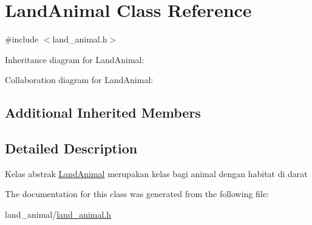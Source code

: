 \hypertarget{classLandAnimal}{}\section{Land\+Animal Class Reference}
\label{classLandAnimal}


{\ttfamily \#include $<$land\+\_\+animal.\+h$>$}



Inheritance diagram for Land\+Animal\+:


Collaboration diagram for Land\+Animal\+:
\subsection*{Additional Inherited Members}


\subsection{Detailed Description}
Kelas abstrak \hyperlink{classLandAnimal}{Land\+Animal} merupakan kelas bagi animal dengan habitat di darat 

The documentation for this class was generated from the following file\+:\begin{DoxyCompactItemize}
\item 
land\+\_\+animal/\hyperlink{land__animal_8h}{land\+\_\+animal.\+h}\end{DoxyCompactItemize}
